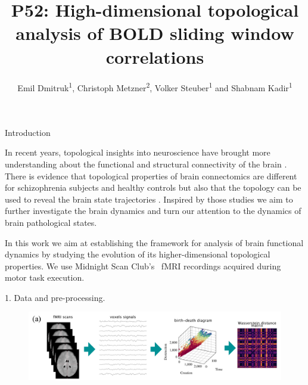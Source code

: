 \documentclass[final]{beamer}
\title[UH poster]{P52: High-dimensional topological analysis of BOLD sliding window correlations}
\author[Dmitruk]{Emil Dmitruk\textsuperscript{1}, Christoph Metzner\textsuperscript{2}, Volker Steuber\textsuperscript{1} and Shabnam Kadir\textsuperscript{1}
}
\institute[UH]{\textsuperscript{1}University of Hertfordshire, UK; \textsuperscript{2}Technische Universität Berlin, Germany}
\begin{document}
\begin{frame}{} 
  \begin{block}{Introduction}
  \small{
      In recent years, topological insights into neuroscience have brought more understanding about the functional and structural connectivity of the brain \cite{Saggar2018a}\cite{Sizemore2018}. There is evidence that topological properties of brain connectomics are different for schizophrenia subjects and healthy controls \cite{Stolz2018} \cite{Dmitruk2021} but also that the topology can be used to reveal the brain state trajectories \cite{Rieck2020a}. Inspired by those studies we aim to further investigate the brain dynamics and turn our attention to the dynamics of brain pathological states.
      
      
    In this work we aim at establishing the framework for analysis of brain functional dynamics by studying the evolution of its higher-dimensional topological properties.
    We use Midnight Scan Club's~\cite{Gordon2017} fMRI recordings acquired during motor task execution.
    }
  \end{block}
      \begin{block}{1. Data and pre-processing.}
      
        \begin{figure}[H]
        \centering
          \includegraphics[width=0.7\linewidth]{images/1-preproc.png}
        \label{fig:preproc}
        \end{figure}

        \begin{columns}
        \centering{
        \small{
        
}}
\end{columns}
\end{block}
\end{frame}
\end{document}
